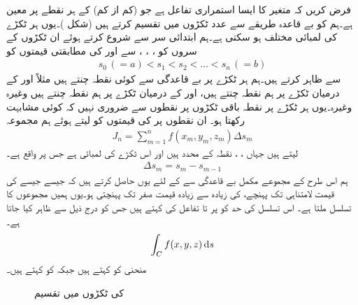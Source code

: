 فرض کریں کہ  متغیر  کا ایسا استمراری تفاعل ہے  جو (کم از کم)  کے ہر نقطے پر معین ہے۔ہم  کو بے قاعدہ طریقے سے  عدد ٹکڑوں میں تقسیم کرتے ہیں (شکل )۔یوں ہر ٹکڑے کی لمبائی مختلف ہو سکتی ہے۔ہم ابتدائی سر سے شروع کرتے ہوئے ان ٹکڑوں کے سروں کو ، ، ،   سے اور  کی مطابقتی قیمتوں کو
\begin{align*}
s_0\,(=a)<s_1<s_2<\dots<s_n\,(=b)
\end{align*}
سے ظاہر کرتے ہیں۔ہم ہر ٹکڑے پر بے قاعدگی سے کوئی نقطہ چنتے ہیں مثلاً  اور  کے درمیان ٹکڑے پر ہم نقطہ  چنتے ہیں،  اور  کے درمیان ٹکڑے پر ہم نقطہ  چنتے ہیں وغیرہ وغیرہ۔یوں ہر ٹکڑے پر نقطہ باقی ٹکڑوں پر نقطوں سے ضروری نہیں کہ کوئی مشابہت رکھتا ہو۔ ان نقطوں پر  کی قیمتوں کو لیتے ہوئے ہم مجموعہ
\begin{align}\label{مساوات_خطی_تکمل_تعریف_بطور_مجموعہ}
J_n=\sum_{m=1}^{n} f(x_m,y_m,z_m)\Delta s_m
\end{align}
لیتے ہیں جہاں ، ،  نقطہ  کے محدد ہیں اور  اس ٹکڑے کی لمبائی ہے جس پر  واقع ہے۔
\begin{align*}
\Delta s_m=s_m-s_{m-1}
\end{align*}
ہم اس طرح کے مجموعے مکمل بے قاعدگی سے  کے لئے یوں حاصل کرتے ہیں کہ جیسے جیسے  کی قیمت لامتناہی تک پہنچے،  کی زیادہ سے زیادہ قیمت صفر تک پہنچتی ہو۔یوں ہمیں مجموعوں کا تسلسل  ملتا ہے۔ اس تسلسل کی حد کو  پر  تا  تفاعل  کی  کہتے ہیں جس کو درج ذیل سے ظاہر کیا جاتا ہے۔
\begin{align*}
\int_C f(x,y,z)\dif s
\end{align*}
منحنی  کو  کہتے ہیں جبکہ  کو  کہتے ہیں۔
%
\begin{figure}
\centering
{}
\caption{ کی ٹکڑوں میں تقسیم}
\label{شکل_سمتی_تکمل_راہ_کی_تقسیم}
\end{figure}

